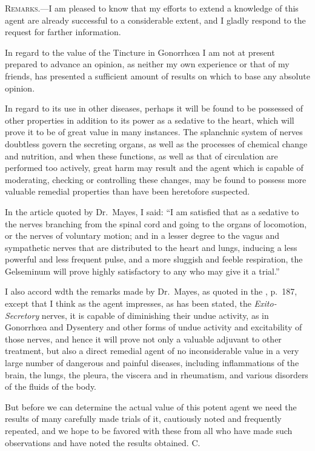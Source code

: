 
\textsc{Remarks.}---I am pleased to know that my efforts to extend a knowledge
of this agent are already successful to a considerable extent, and I
gladly respond to the request for farther information.

In regard to the value of the Tincture in Gonorrhœa I am not at
present prepared to advance an opinion, as neither my own experience
or that of my friends, has presented a sufficient amount of results on
which to base any absolute opinion.

In regard to its use in other diseases, perhaps it will be found to be
possessed of other properties in addition to its power as a sedative to
the heart, which will prove it to be of great value in many instances.
The splanchnic system of nerves doubtless govern the secreting organs,
as well as the processes of chemical change and nutrition, and when
these functions, as well as that of circulation are performed too actively,
great harm may result and the agent which is capable of
moderating, checking or controlling these changes, may be found to
possess more valuable remedial properties than have been heretofore
suspected.

In the article quoted by Dr.\ Mayes, I said: ``I am satisfied that as
a sedative to the nerves branching from the spinal cord and going to
the organs of locomotion, or the nerves of voluntary motion; and in a
lesser degree to the vagus and sympathetic nerves that are distributed
to the heart and lungs, inducing a less powerful and less frequent pulse,
and a more sluggish and feeble respiration, the Gelseminum will prove
highly satisfactory to any who may give it a trial.''

I also accord wdth the remarks made by Dr.\ Mayes, as quoted in the
, p.~187, except that I think as the agent impresses, as has
been stated, the \emph{Exito-Secretory} nerves, it is capable of diminishing their
undue activity, as in Gonorrhœa and Dysentery and other forms of undue
activity and excitability of those nerves, and hence it will prove
not only a valuable adjuvant to other treatment, but also a direct remedial
agent of no inconsiderable value in a very large number of dangerous
and painful diseases, including inflammations of the brain, the
lungs, the pleura, the viscera and in rheumatism, and various disorders
of the fluids of the body.

But before we can determine the actual value of this potent agent
we need the results of many carefully made trials of it, cautiously noted
and frequently repeated, and we hope to be favored with these from
all who have made such observations and have noted the results obtained.
\hfill{}C.\endinput
